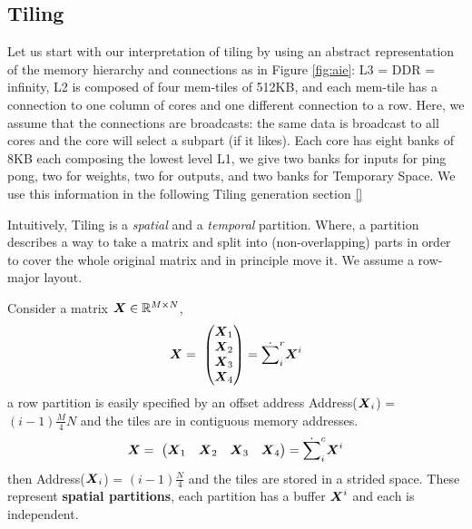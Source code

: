 \documentclass[acmsmall]{acmart}
\begin{document}
\subsection{Tiling}
\label{sec:tiling}

Let us start with our interpretation of tiling by using an abstract
representation of the memory hierarchy and connections as in Figure
\ref{fig:aie}: L3 = DDR = infinity, L2 is composed of four mem-tiles
of 512KB, and each mem-tile has a connection to one column of cores
and one different connection to a row. Here, we assume that the
connections are broadcasts: the same data is broadcast to all cores
and the core will select a subpart (if it likes). Each core has eight
banks of 8KB each composing the lowest level L1, we give two banks for
inputs for ping pong, two for weights, two for outputs, and two banks
for Temporary Space. We use this information in the following Tiling
generation section \ref{} 

Intuitively, Tiling is a {\em spatial} and a {\em temporal}
partition. Where, a partition describes a way to take a matrix and
split into (non-overlapping) parts in order to cover the whole
original matrix and in principle move it. We assume a row-major
layout.

\begin{definition}
   Consider a matrix ${\boldsymbol X} \in
  \mathbb{R}^{M\times N}$, 
  \begin{equation}
    {\boldsymbol X}  = \
    \begin{pmatrix}
      {\boldsymbol X}_1  \\
      {\boldsymbol X}_2  \\
      {\boldsymbol X}_3  \\
      {\boldsymbol X}_4  \\
    \end{pmatrix} = \dot\sum_i^r {\boldsymbol X}^i
  \end{equation}
  a row partition is easily specified by an offset address
  Address(${\boldsymbol X}_i$) = $(i-1)\frac{M}{4}N$ and the tiles are in
  contiguous memory addresses.
  \begin{equation}
    {\boldsymbol X}  = \
    \begin{pmatrix}
      {\boldsymbol X}_1  & {\boldsymbol X}_2  &  {\boldsymbol X}_3  &   {\boldsymbol X}_4  \\
    \end{pmatrix} = \dot\sum_i^c {\boldsymbol X}^i
  \end{equation}
  then Address(${\boldsymbol X}_i$) = $(i-1)\frac{N}{4}$ and the tiles are
  stored in a strided space.  These represent {\bf spatial
    partitions}, each partition has a buffer ${\boldsymbol X}^i$ and each is
  independent.
\end{definition}
\end{document}
